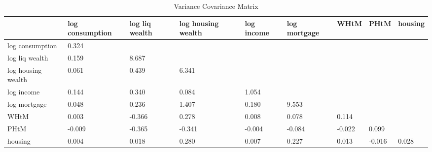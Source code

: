 \begin{table}[htbp]
\caption{\label{clabel} Variance Covariance Matrix}\centering\medskip
\begin{tabular}{lllllllll} \hline \hline
 & log consumption  & log liq wealth  & log housing wealth  & log income  & log mortgage  & WHtM  & PHtM  & housing  \\  \hline 
log consumption &     0.324 \\  
log liq wealth &     0.159 &     8.687 \\  
log housing wealth &     0.061 &     0.439 &     6.341 \\  
log income &     0.144 &     0.340 &     0.084 &     1.054 \\  
log mortgage &     0.048 &     0.236 &     1.407 &     0.180 &     9.553 \\  
WHtM &     0.003 &    -0.366 &     0.278 &     0.008 &     0.078 &     0.114 \\  
PHtM &    -0.009 &    -0.365 &    -0.341 &    -0.004 &    -0.084 &    -0.022 &     0.099 \\  
housing &     0.004 &     0.018 &     0.280 &     0.007 &     0.227 &     0.013 &    -0.016 &     0.028 \\  
\hline \hline \end{tabular}
\end{table}
